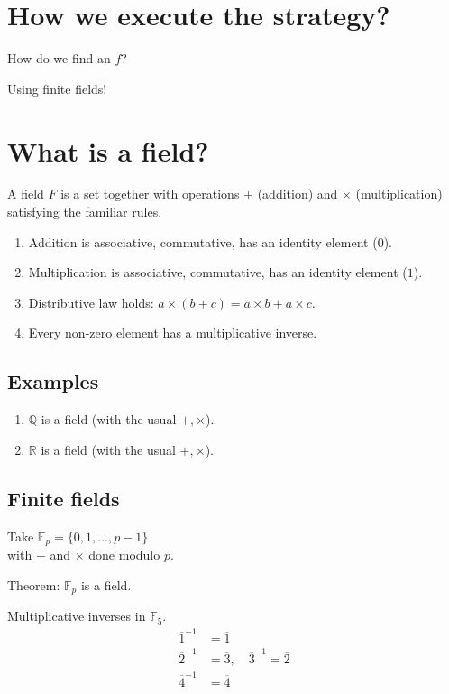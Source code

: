 \documentclass[11pt]{article}
\begin{document}
\section*{How we execute the strategy?}
\label{sec:orgcf66243}

How do we find an \(f\)?

Using finite fields!

\section*{What is a field?}
\label{sec:orgfa69a2f}

A field \(F\) is a set together with operations \(+\) (addition) and \(\times\) (multiplication) satisfying the familiar rules.

\begin{enumerate}
\item Addition is associative, commutative, has an identity element (\(0\)).
\item Multiplication is associative, commutative, has an identity element (\(1\)).
\item Distributive law holds: \(a \times (b+c) = a \times b + a \times c\).
\item Every non-zero element has a multiplicative inverse.
\end{enumerate}

\subsection*{Examples}
\label{sec:org07f68b6}
\begin{enumerate}
\item \(\mathbb Q\) is a field (with the usual \(+, \times\)).
\item \(\mathbb R\) is a field (with the usual \(+, \times\)).
\end{enumerate}

\subsection*{Finite fields}
\label{sec:org51a271f}
Take \(\mathbb F_p = \{0,1,\dots, p-1\}\)\\
with \(+\) and \(\times\) done modulo \(p\).

Theorem: \(\mathbb F_p\) is a field.


Multiplicative inverses in \(\mathbb F_5\).
   \begin{align*}
\overline{1}^{-1} &= \overline 1 \\
\overline{2}^{-1} &= \overline 3, \quad \overline{3}^{-1} = \overline 2 \\
\overline{4}^{-1} &= \overline 4
   \end{align*}
\end{document}
